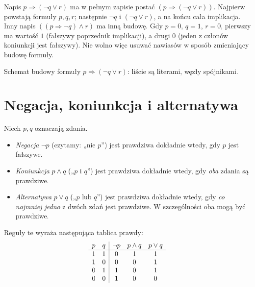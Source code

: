 \begin{przyklad}\label{ex:parse-tree-xli}
Napis $p\Rightarrow(\neg q\lor r)$ ma w pełnym zapisie postać
$(p\Rightarrow(\neg q\lor r))$. Najpierw powstają
formuły $p,q,r$; następnie $\neg q$ i
$(\neg q\lor r)$, a na końcu cała implikacja.
Inny napis $((p\Rightarrow\neg q)\land r)$ ma inną budowę.
Gdy $p=0$, $q=1$, $r=0$, pierwszy ma wartość $1$
(fałszywy poprzednik implikacji), a drugi $0$
(jeden z członów koniunkcji jest fałszywy). Nie wolno więc
usuwać nawiasów w sposób zmieniający budowę formuły.
\end{przyklad}

\begin{center}
\par\smallskip
\small Schemat budowy formuły
$p\Rightarrow(\neg q\lor r)$: liście są literami, węzły spójnikami.
\end{center}

\section{Negacja, koniunkcja i alternatywa}\label{sec:connectives-first}
\begin{definicja}\label{def:not-and-or}
Niech $p,q$ oznaczają zdania.
\begin{itemize}
\item \emph{Negacja} $\neg p$ (czytamy: „nie $p$”) jest prawdziwa
      dokładnie wtedy, gdy $p$ jest fałszywe.
\item \emph{Koniunkcja} $p\land q$ („$p$ i $q$”) jest prawdziwa
      dokładnie wtedy, gdy \emph{oba} zdania są prawdziwe.
\item \emph{Alternatywa} $p\lor q$ („$p$ lub $q$”) jest prawdziwa
      dokładnie wtedy, gdy \emph{co najmniej jedno} z dwóch zdań
      jest prawdziwe. W szczególności oba mogą być prawdziwe.
\end{itemize}
Reguły te wyraża następująca tablica prawdy:
\[
\begin{array}{c c|c c c}
p&q&\neg p&p\land q&p\lor q\\\hline
1&1&0&1&1\\
1&0&0&0&1\\
0&1&1&0&1\\
0&0&1&0&0
\end{array}
\]
\end{definicja}

